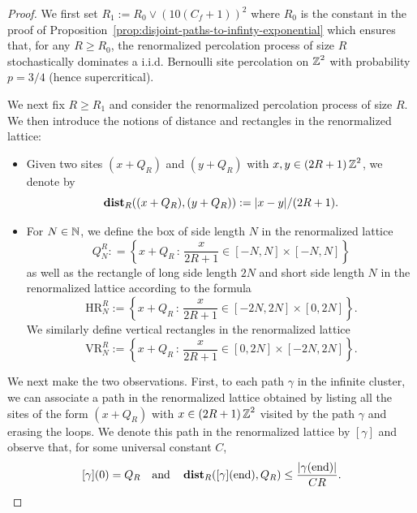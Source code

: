 \documentclass[12pt]{amsart}
\numberwithin{equation}{section}
\begin{document}
	
	\begin{proof}
		We first set $R_1 := R_0 \vee \left( 10 (C_f + 1) \right)^2$ where $R_0$ is the constant in the proof of Proposition~\ref{prop:disjoint-paths-to-infinty-exponential} which ensures that, for any $R \geq R_0$, the renormalized percolation process of size $R$ stochastically dominates a i.i.d. Bernoulli site percolation on $\operatorname{\mathbb{Z}}^2$ with probability $p = 3/4$ (hence supercritical).
		
		We next fix $R \geq R_1$ and consider the renormalized percolation process of size $R$. We then introduce the notions of distance and rectangles in the renormalized lattice:
		\begin{itemize}
			\item Given two sites $(x + Q_R)$ and $(y + Q_R)$ with $x , y \in (2R + 1) \operatorname{\mathbb{Z}}^2$, we denote by $$\operatorname{\mathop{\bf dist{}}}_R ( (x + Q_R) , (y + Q_R) ) := |x - y|/(2R+1).$$
			\item For $N \in \operatorname{\mathbb{N}}$, we define the box of side length $N$ in the renormalized lattice
			\begin{equation*}
				Q^R_N : = \left\{ x + Q_R \, : \, \frac{x}{2R +1} \in   [-N , N] \times [- N,  N] \right\}
			\end{equation*}
			as well as the rectangle of long side length $2N$ and short side length $N$ in the renormalized lattice according to the formula
			\begin{equation*}
				\mathrm{HR}^R_N := \left\{ x + Q_R \, : \, \frac{x}{2R +1} \in   [- 2N , 2 N] \times [0,  2N] \right\}. 
			\end{equation*}
			We similarly define vertical rectangles in the renormalized lattice
			\begin{equation*}
				\mathrm{VR}^R_N := \left\{ x + Q_R \, : \, \frac{x}{2R +1} \in   [0 ,  2N] \times [- 2N,  2N]   \right\}.
			\end{equation*}
		\end{itemize}
		We next make the two observations. First, to each path $\gamma$ in the infinite cluster, we can associate a path in the renormalized lattice obtained by listing all the sites of the form $(x + Q_R)$ with $x \in (2R+1)\operatorname{\mathbb{Z}}^2$ visited by the path $\gamma$ and erasing the loops. We denote this path in the renormalized lattice by $[\gamma]$ and observe that, for some universal constant $C$,
		\begin{equation} \label{eq:firstconditiongammarenormalized}
			[\gamma](0) = Q_R \quad \mbox{and} \quad \operatorname{\mathop{\bf dist{}}}_R ([\gamma](\mathrm{end}) , Q_R) \leq \frac{\left| \gamma(\mathrm{end})\right|}{CR}.
		\end{equation}

\end{proof}
\end{document}
